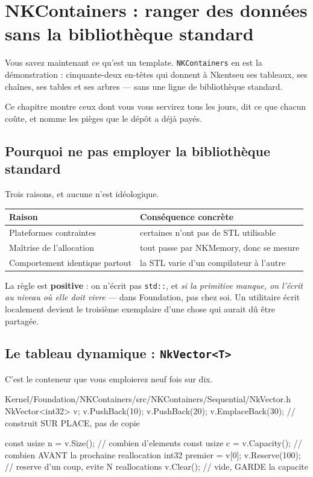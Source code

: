 \chapter{NKContainers : ranger des données sans la bibliothèque standard}

Vous savez maintenant ce qu'est un template. \texttt{NKContainers} en est la
démonstration : cinquante-deux en-têtes qui donnent à Nkentseu ses tableaux, ses
chaînes, ses tables et ses arbres --- sans une ligne de bibliothèque standard.

Ce chapitre montre ceux dont vous vous servirez tous les jours, dit ce que
chacun coûte, et nomme les pièges que le dépôt a déjà payés.

\section{Pourquoi ne pas employer la bibliothèque standard}

Trois raisons, et aucune n'est idéologique.

\begin{center}
\begin{tabular}{@{}ll@{}}
\toprule
\textbf{Raison} & \textbf{Conséquence concrète} \\
\midrule
Plateformes contraintes & certaines n'ont pas de STL utilisable \\
Maîtrise de l'allocation & tout passe par NKMemory, donc se mesure \\
Comportement identique partout & la STL varie d'un compilateur à l'autre \\
\bottomrule
\end{tabular}
\end{center}

\begin{nkretenir}
La règle est \textbf{positive} : on n'écrit pas \texttt{std::}, et \emph{si la
primitive manque, on l'écrit au niveau où elle doit vivre} --- dans Foundation,
pas chez soi. Un utilitaire écrit localement devient le troisième exemplaire
d'une chose qui aurait dû être partagée.
\end{nkretenir}

\section{Le tableau dynamique : \texttt{NkVector<T>}}

C'est le conteneur que vous emploierez neuf fois sur dix.

\begin{nkcode}{Kernel/Foundation/NKContainers/src/NKContainers/Sequential/NkVector.h}
NkVector<int32> v;
v.PushBack(10);
v.PushBack(20);
v.EmplaceBack(30);            // construit SUR PLACE, pas de copie

const usize n = v.Size();     // combien d'elements
const usize c = v.Capacity(); // combien AVANT la prochaine reallocation
int32 premier = v[0];
v.Reserve(100);               // reserve d'un coup, evite N reallocations
v.Clear();                    // vide, GARDE la capacite
\end{nkcode}

